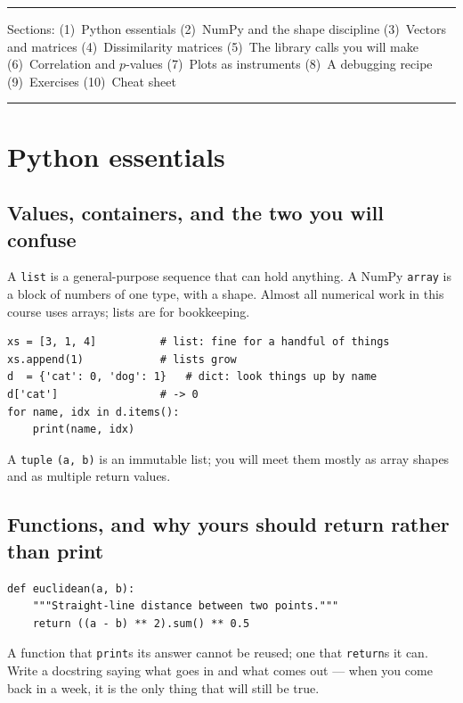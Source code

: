 \documentclass[11pt]{article}
\begin{document}
\vspace{4pt}
\hrule
\vspace{6pt}
{\small\color{lightgray} Sections: (1)~Python essentials \quad (2)~NumPy and the shape
discipline \quad (3)~Vectors and matrices \quad (4)~Dissimilarity matrices \quad
(5)~The library calls you will make \quad (6)~Correlation and $p$-values \quad
(7)~Plots as instruments \quad (8)~A debugging recipe \quad (9)~Exercises \quad
(10)~Cheat sheet}
\vspace{6pt}
\hrule

\section{Python essentials}

\subsection{Values, containers, and the two you will confuse}

A \texttt{list} is a general-purpose sequence that can hold anything. A NumPy
\texttt{array} is a block of numbers of one type, with a shape. Almost all
numerical work in this course uses arrays; lists are for bookkeeping.

\begin{lstlisting}
xs = [3, 1, 4]          # list: fine for a handful of things
xs.append(1)            # lists grow
d  = {'cat': 0, 'dog': 1}   # dict: look things up by name
d['cat']                # -> 0
for name, idx in d.items():
    print(name, idx)
\end{lstlisting}

A \texttt{tuple} \texttt{(a, b)} is an immutable list; you will meet them mostly
as array shapes and as multiple return values.

\subsection{Functions, and why yours should return rather than print}

\begin{lstlisting}
def euclidean(a, b):
    """Straight-line distance between two points."""
    return ((a - b) ** 2).sum() ** 0.5
\end{lstlisting}

A function that \texttt{print}s its answer cannot be reused; one that
\texttt{return}s it can. Write a docstring saying what goes in and what comes
out --- when you come back in a week, it is the only thing that will still be
true.
\end{document}
